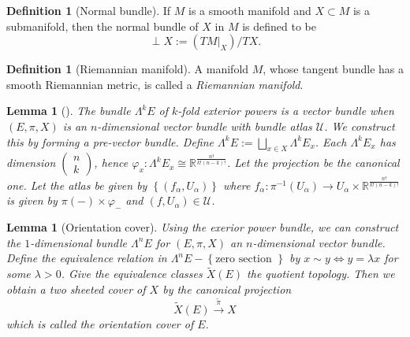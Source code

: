 \documentclass[reqno]{amsart}
\newtheorem{lemma}[theorem]{Lemma}
\theoremstyle{definition}
\newtheorem{definition}[theorem]{Definition}
\theoremstyle{remark}
\begin{document}
    \begin{definition}[Normal bundle]
        If $M$ is a smooth manifold and
        $X \subset M$ is a submanifold, then
        the normal bundle of $X$ in $M$ is defined to be
        \[
        \perp X :=
        \left( TM|_X \right) / TX.
        \] 
    \end{definition}

    \begin{definition}[Riemannian manifold]
        A manifold $M$, whose tangent bundle has
        a smooth Riemannian metric, is called
        a \textit{Riemannian manifold}.
    \end{definition}

    \begin{lemma}[]
        The bundle $\Lambda^{k} E$ of
        $k$-fold exterior powers
        is a vector bundle when
        $\left( E, \pi, X \right) $ is an
        $n$-dimensional vector bundle with
        bundle atlas $\mathcal{U}$.
        We construct this by forming a pre-vector bundle.
        Define
        $\Lambda^{k}E :=
        \bigsqcup_{x \in X} \Lambda^{k} E_x$.
        Each $\Lambda^{k}E_x$ has dimension
        $\begin{pmatrix} n \\ k \end{pmatrix} $, hence
        $\varphi_x \colon
        \Lambda^{k} E_x \cong \mathbb{R}^{\frac{n!}{k! (n-k)!} }$.
        Let the projection be the canonical one.
        Let the atlas be given
        by
        $\left\{ \left( f_{\alpha},
        U_{\alpha} \right)  \right\} $ where
        $f_{\alpha} \colon \pi^{-1}(U_{\alpha})
        \to U_{\alpha} \times \mathbb{R}^{\frac{n!}{k! 
        \left( n-k \right)!}}$ 
        is given by
        $\pi(-) \times \varphi_{-}$ 
        and
        $\left( f, U_{\alpha} \right) 
        \in \mathcal{U}$.
    \end{lemma}

    \begin{lemma}[Orientation cover]
        Using the exerior power bundle, we can
        construct the $1$-dimensional bundle
        $\Lambda^{n}E$ for $\left( E, \pi, X \right) $ an
        $n$-dimensional vector bundle.
        Define the equivalence relation
        in $\Lambda^{n}E - \left\{ \text{zero section } \right\} $ 
        by $x \sim y \iff y = \lambda x$ for some
        $\lambda > 0$. Give the equivalence classes
        $\tilde{X}(E)$ the quotient topology. Then
        we obtain a two sheeted cover
        of $X$ by the canonical projection
        \[
            \tilde{X}(E) \stackrel{\tilde{\pi}}{\to } X
        \] 
        which is called the orientation cover of $E$.
    \end{lemma}
\end{document}
